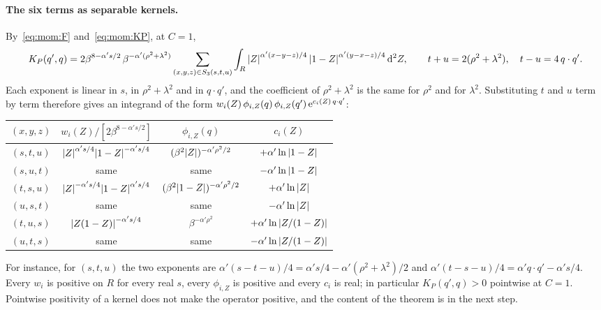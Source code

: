 \paragraph{The six terms as separable kernels.}
By~\eqref{eq:mom:F} and~\eqref{eq:mom:KP}, at $C = 1$,
\begin{equation}
  \label{eq:mom:six-terms}
  K_P(q', q)
    = 2 \beta^{8 - \alpha' s / 2} \, \beta^{- \alpha' (\rho^2 + \lambda^2)} \sum_{(x, y, z) \in S_3(s, t, u)} \int_R {|Z|}^{\alpha' (x - y - z) / 4} \, {|1 - Z|}^{\alpha' (y - x - z) / 4} \, \mathrm{d}^2 Z,
  \qquad
  t + u
    = 2 (\rho^2 + \lambda^2),
  \quad
  t - u
    = 4 \, q \cdot q'.
\end{equation}
Each exponent is linear in $s$, in $\rho^2 + \lambda^2$ and in $q \cdot q'$, and the coefficient of $\rho^2 + \lambda^2$ is the same for $\rho^2$ and for $\lambda^2$.
Substituting $t$ and $u$ term by term therefore gives an integrand of the form $w_i(Z) \, \phi_{i, Z}(q) \, \phi_{i, Z}(q') \, \mathrm{e}^{c_i(Z) \, q \cdot q'}$:
\begin{center}
  \begin{tabular}{cccc}
    \toprule
    $(x, y, z)$ & $w_i(Z) / [2 \beta^{8 - \alpha' s / 2}]$ & $\phi_{i, Z}(q)$ & $c_i(Z)$ \\
    \midrule
    $(s, t, u)$ & ${|Z|}^{\alpha' s / 4} {|1 - Z|}^{- \alpha' s / 4}$ & $(\beta^2 {|Z|})^{- \alpha' \rho^2 / 2}$ & $+ \alpha' \ln {|1 - Z|}$ \\
    $(s, u, t)$ & same & same & $- \alpha' \ln {|1 - Z|}$ \\
    $(t, s, u)$ & ${|Z|}^{- \alpha' s / 4} {|1 - Z|}^{\alpha' s / 4}$ & $(\beta^2 {|1 - Z|})^{- \alpha' \rho^2 / 2}$ & $+ \alpha' \ln {|Z|}$ \\
    $(u, s, t)$ & same & same & $- \alpha' \ln {|Z|}$ \\
    $(t, u, s)$ & ${|Z (1 - Z)|}^{- \alpha' s / 4}$ & $\beta^{- \alpha' \rho^2}$ & $+ \alpha' \ln {|Z / (1 - Z)|}$ \\
    $(u, t, s)$ & same & same & $- \alpha' \ln {|Z / (1 - Z)|}$ \\
    \bottomrule
  \end{tabular}
\end{center}
For instance, for $(s, t, u)$ the two exponents are $\alpha' (s - t - u) / 4 = \alpha' s / 4 - \alpha' (\rho^2 + \lambda^2) / 2$ and $\alpha' (t - s - u) / 4 = \alpha' q \cdot q' - \alpha' s / 4$.
Every $w_i$ is positive on $R$ for every real $s$, every $\phi_{i, Z}$ is positive and every $c_i$ is real; in particular $K_P(q', q) > 0$ pointwise at $C = 1$.
Pointwise positivity of a kernel does not make the operator positive, and the content of the theorem is in the next step.

